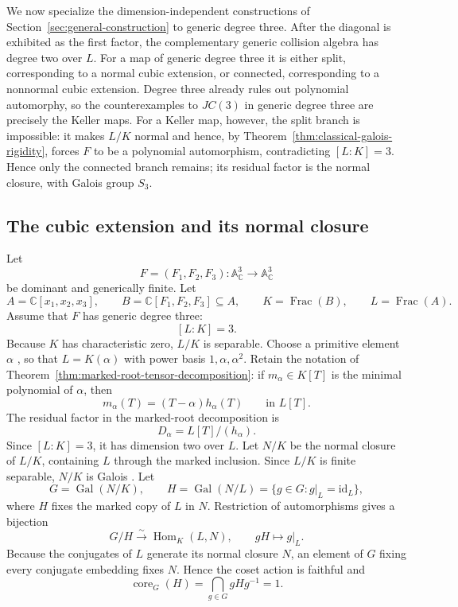 \documentclass[11pt]{article}
\theoremstyle{remark}
\DeclareMathOperator{\Frac}{Frac}
\DeclareMathOperator{\Gal}{Gal}
\DeclareMathOperator{\Hom}{Hom}
\DeclareMathOperator{\core}{core}
\newcommand{\A}{\mathbb A}
\newcommand{\C}{\mathbb C}
\newcommand{\id}{\mathrm{id}}
\begin{document}
We now specialize the dimension-independent constructions of
Section~\ref{sec:general-construction} to generic degree three.  After the
diagonal is exhibited as the first factor, the complementary
generic collision algebra has degree two over \(L\).  For a map of generic
degree three it is either split,
corresponding to a normal cubic extension, or connected, corresponding to
a nonnormal cubic extension.  Degree three already rules out polynomial
automorphy, so the counterexamples to \(JC(3)\) in generic degree three are
precisely the Keller maps.  For a Keller map, however, the split branch is
impossible: it makes \(L/K\) normal and hence, by
Theorem~\ref{thm:classical-galois-rigidity}, forces \(F\) to be a polynomial
automorphism, contradicting \([L:K]=3\).  Hence only the connected branch
remains; its residual factor is the normal closure, with Galois group
\(S_3\).

\subsection{The cubic extension and its normal closure}
\label{sec:cubic-extension}

Let
\[
  F=(F_1,F_2,F_3)\colon\A^3_{\C}\longrightarrow\A^3_{\C}
\]
be dominant and generically finite.  Let
\[
  A=\C[x_1,x_2,x_3],
  \qquad
  B=\C[F_1,F_2,F_3]\subseteq A,
  \qquad
  K=\Frac(B),
  \qquad
  L=\Frac(A).
\]
Assume that \(F\) has generic degree three:
\[
  [L:K]=3.
\]
Because \(K\) has characteristic zero, \(L/K\) is separable.  Choose a
primitive element \(\alpha\)
\cite{StacksPrimitiveElement},
so that
\(L=K(\alpha)\) with power basis
\(1,\alpha,\alpha^2\).
Retain the notation of
Theorem~\ref{thm:marked-root-tensor-decomposition}: if \(m_\alpha\in K[T]\)
is the minimal polynomial of \(\alpha\), then
\[
  m_\alpha(T)=(T-\alpha)h_\alpha(T)
  \qquad\text{in }L[T].
\]
The residual factor in the marked-root decomposition is
\[
  D_\alpha=L[T]/(h_\alpha).
\]
Since \([L:K]=3\), it has dimension two over \(L\).
Let \(N/K\) be the normal closure of \(L/K\), containing \(L\) through
the marked inclusion.  Since \(L/K\) is finite separable, \(N/K\) is
Galois
\cite{StacksNormalClosureGalois}.
Let
\[
  G=\Gal(N/K),
  \qquad
  H=\Gal(N/L)=\{g\in G:g|_L=\id_L\},
\]
where \(H\) fixes the marked copy of \(L\) in \(N\).
Restriction of automorphisms gives a bijection
\[
  G/H\xrightarrow{\sim}\Hom_K(L,N),
  \qquad gH\longmapsto g|_L.
\]
Because the conjugates of \(L\) generate its normal closure \(N\), an
element of \(G\) fixing every conjugate embedding fixes \(N\).  Hence the
coset action is faithful and
\[
  \core_G(H)=\bigcap_{g\in G}gHg^{-1}=1.
\]
\end{document}
